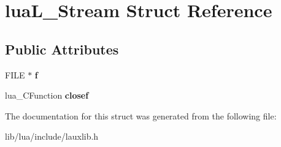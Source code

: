 \hypertarget{structlua_l___stream}{}\section{lua\+L\+\_\+\+Stream Struct Reference}
\label{structlua_l___stream}
\subsection*{Public Attributes}
\begin{DoxyCompactItemize}
\item 
\hypertarget{structlua_l___stream_a50fc81b2c6481ab7768e41bdd3793bab}{}F\+I\+L\+E $\ast$ {\bfseries f}\label{structlua_l___stream_a50fc81b2c6481ab7768e41bdd3793bab}

\item 
\hypertarget{structlua_l___stream_a98731a1b0b1e28336d7206798895e62f}{}lua\+\_\+\+C\+Function {\bfseries closef}\label{structlua_l___stream_a98731a1b0b1e28336d7206798895e62f}

\end{DoxyCompactItemize}


The documentation for this struct was generated from the following file\+:\begin{DoxyCompactItemize}
\item 
lib/lua/include/lauxlib.\+h\end{DoxyCompactItemize}
